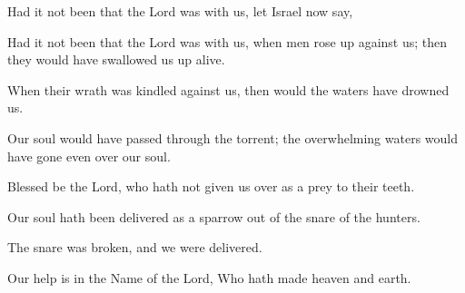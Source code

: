 Had it not been that the Lord was with us, let Israel now say,

Had it not been that the Lord was with us, when men rose up against us; then they would have swallowed us up alive.

When their wrath was kindled against us, then would the waters have drowned us.

Our soul would have passed through the torrent; the overwhelming waters would have gone even over our soul.

Blessed be the Lord, who hath not given us over as a prey to their teeth.

Our soul hath been delivered as a sparrow out of the snare of the hunters.

The snare was broken, and we were delivered.

Our help is in the Name of the Lord, Who hath made heaven and earth.
